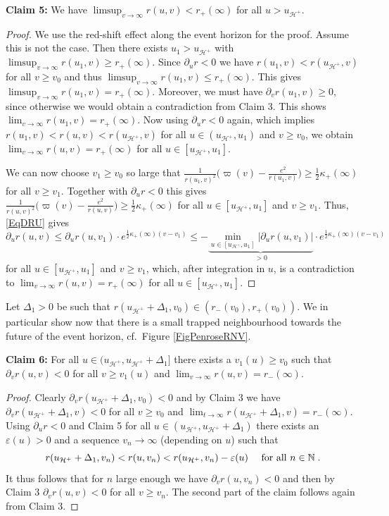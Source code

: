 \documentclass[reqno]{article}
\newcommand{\N}{\mathbb{N}}
\newcommand{\uh}{u_{\mathcal{H}^+}}
\newcommand{\rd}{\partial}
\begin{document}
\textbf{Claim 5:} We have $\limsup_{v \to \infty} r(u,v) < r_+(\infty)$ for all $u > \uh$.
\begin{proof}
We use the red-shift effect along the event horizon for the proof. Assume this is not the case. Then there exists $u_1 > \uh$ with $\limsup_{v \to \infty} r(u_1, v) \geq r_+(\infty)$. Since $\partial_u r <0$ we have $r(u_1,v) < r(\uh, v)$ for all $v \geq v_0$ and thus $\limsup_{v \to \infty} r(u_1,v) \leq r_+(\infty)$. This gives $\limsup_{v \to \infty} r(u_1, v) = r_+(\infty)$.  Moreover, we must have $\rd_v r(u_1, v) \geq 0$, since otherwise we would obtain a contradiction from Claim 3. This shows $\lim_{v \to \infty}r(u_1, v) = r_+(\infty)$. Now using $\rd_u r <0$ again, which implies $r(u_1, v) < r(u,v) < r(\uh, v)$ for all $u \in (\uh, u_1)$ and $v \geq v_0$, we obtain $\lim_{v \to \infty} r(u,v) = r_+(\infty)$ for all $u \in [\uh, u_1]$.

We can now choose $v_1 \geq v_0$ so large that $\frac{1}{r(u_1,v)^2}\big(\varpi(v) - \frac{e^2}{r(u_1,v)}\big) \geq \frac{1}{2} \kappa_+(\infty)$ for all $v \geq v_1$. Together with $\rd_u r <0$ this gives $\frac{1}{r(u,v)^2}\big(\varpi(v) - \frac{e^2}{r(u,v)}\big) \geq \frac{1}{2} \kappa_+(\infty)$ for all $u \in [\uh, u_1]$ and $v \geq v_1$. Thus, \eqref{EqDRU} gives
$$\rd_u r(u,v) \leq \rd_u r(u, v_1) \cdot e^{\frac{1}{2} \kappa_+(\infty) (v - v_1)} \leq - \underbrace{\min_{u \in [\uh, u_1]} |\rd_u r(u, v_1)|}_{>0} \cdot e^{\frac{1}{2} \kappa_+(\infty) (v - v_1)} $$ for all $u \in [\uh, u_1] $ and $v \geq v_1$, which, after integration in $u$, is a contradiction to $\lim_{v \to \infty} r(u,v) = r_+(\infty)$ for all $u \in [\uh, u_1]$.
\end{proof}

Let $\Delta_1 >0$ be such that $r(\uh + \Delta_1, v_0) \in (r_-(v_0), r_+(v_0))$. We in particular show now that there is a small trapped neighbourhood towards the future of the event horizon, cf.\ Figure \ref{FigPenroseRNV}.

\textbf{Claim 6:} For all $u \in (\uh, \uh + \Delta_1]$ there exists a $v_1(u) \geq v_0$ such that $\rd_v r(u,v) <0$ for all $v \geq v_1(u)$ and $\lim_{v \to \infty} r(u,v) = r_-(\infty)$.
\begin{proof}
Clearly $\rd_v r(\uh + \Delta_1, v_0) <0$ and by Claim 3 we have $\rd_v r(\uh + \Delta_1, v) <0$ for all $v \geq v_0$ and $\lim_{t \to \infty} r(\uh + \Delta_1, v ) = r_-(\infty)$. Using $\partial_u r <0$ and Claim 5 for all $u \in (\uh, \uh + \Delta_1)$ there exists an $\varepsilon(u) >0$ and a sequence $v_n \to \infty$ (depending on $u$) such that
$$r(\uh + \Delta_1, v_n) < r(u,v_n) < r(\uh, v_n) - \varepsilon(u) \quad \textnormal{ for all } n \in \N \;.$$
It thus follows that for $n$ large enough we have $\rd_v r(u,v_n) <0$ and then by Claim 3 $\rd_v r(u, v) <0$ for all $v \geq v_n$. The second part of the claim follows again from Claim 3.
\end{proof}
\end{document}

